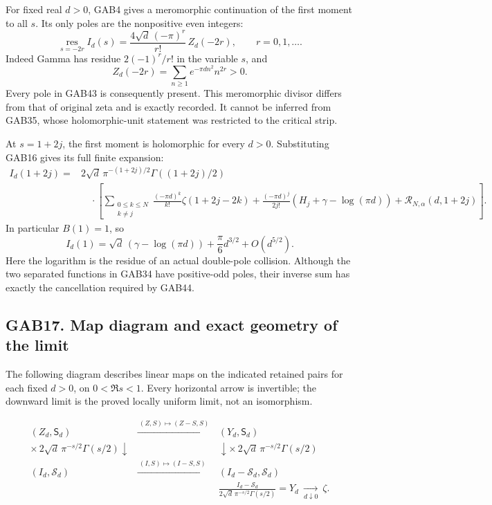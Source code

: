 \documentclass[
  10pt,
  a4paper,
]{article}
\begin{document}
For fixed real \(d>0\), GAB4 gives a meromorphic continuation of the
first moment to all \(s\). Its only poles are the nonpositive even
integers: \[
 \operatorname*{res}_{s=-2r} I_d(s)
 =\frac{4\sqrt d\,(-\pi)^r}{r!}\,Z_d(-2r),
 \qquad r=0,1,\ldots.                                 \tag{GAB43}
\] Indeed Gamma has residue \(2(-1)^r/r!\) in the variable \(s\), and \[
 Z_d(-2r)=\sum_{n\ge1}e^{-\pi d n^2}n^{2r}>0.
\] Every pole in GAB43 is consequently present. This meromorphic divisor
differs from that of original zeta and is exactly recorded. It cannot be
inferred from GAB35, whose holomorphic-unit statement was restricted to
the critical strip.

At \(s=1+2j\), the first moment is holomorphic for every \(d>0\).
Substituting GAB16 gives its full finite expansion: \[
 \begin{aligned}
 I_d(1+2j)
 ={}&2\sqrt d\,\pi^{-(1+2j)/2}\Gamma((1+2j)/2)\\
 &\quad\cdot\left[
   \sum_{\substack{0\le k\le N\\k\ne j}}
       \frac{(-\pi d)^k}{k!}\zeta(1+2j-2k)
   +\frac{(-\pi d)^j}{2j!}
        (H_j+\gamma-\log(\pi d))
   +\mathcal R_{N,\alpha}(d,1+2j)\right].
 \end{aligned}                                       \tag{GAB44}
\] In particular \(B(1)=1\), so \[
 I_d(1)=\sqrt d\,(\gamma-\log(\pi d))
                   +\frac{\pi}{6}d^{3/2}+O(d^{5/2}).
\] Here the logarithm is the residue of an actual double-pole collision.
Although the two separated functions in GAB34 have positive-odd poles,
their inverse sum has exactly the cancellation required by GAB44.

\subsection{GAB17. Map diagram and exact geometry of the
limit}\label{gab17.-map-diagram-and-exact-geometry-of-the-limit}

The following diagram describes linear maps on the indicated retained
pairs for each fixed \(d>0\), on \(0<\Re s<1\). Every horizontal arrow
is invertible; the downward limit is the proved locally uniform limit,
not an isomorphism.

\[
 \begin{array}{ccc}
 (Z_d,\mathsf S_d)
 &\xrightarrow{\ (Z,S)\mapsto(Z-S,S)\ }&
 (Y_d,\mathsf S_d)\\[2mm]
 {\scriptstyle\times\,2\sqrt d\,\pi^{-s/2}\Gamma(s/2)}
 \downarrow&&
 \downarrow
 {\scriptstyle\times\,2\sqrt d\,\pi^{-s/2}\Gamma(s/2)}\\[2mm]
 (I_d,\mathcal S_d)
 &\xrightarrow{\ (I,S)\mapsto(I-S,S)\ }&
 (I_d-\mathcal S_d,\mathcal S_d)\\[2mm]
 &&\displaystyle
 \frac{I_d-\mathcal S_d}
 {2\sqrt d\,\pi^{-s/2}\Gamma(s/2)}
 =Y_d\ \xrightarrow[d\downarrow0]{}\ \zeta .
 \end{array}                                          \tag{GAB45}
\]
\end{document}
